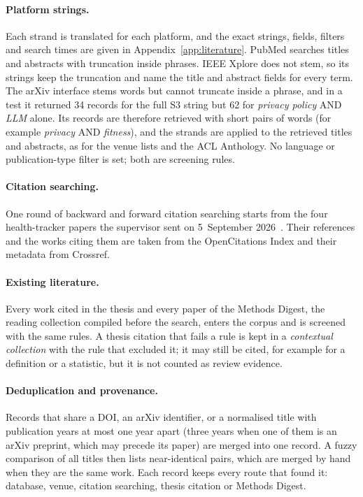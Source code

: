 \paragraph{Platform strings.} Each strand is translated for each platform, and
the exact strings, fields, filters and search times are given in
Appendix~\ref{app:literature}. PubMed searches titles and abstracts with
truncation inside phrases. IEEE Xplore does not stem, so its strings keep the
truncation and name the title and abstract fields for every term. The arXiv
interface stems words but cannot truncate inside a phrase, and in a test it
returned 34 records for the full S3 string but 62 for \emph{privacy policy} AND
\emph{LLM} alone. Its records are therefore retrieved with short pairs of words
(for example \emph{privacy} AND \emph{fitness}), and the strands are applied to
the retrieved titles and abstracts, as for the venue lists and the ACL
Anthology. No language or publication-type filter is set; both are screening
rules.

\paragraph{Citation searching.} One round of backward and forward citation
searching starts from the four health-tracker papers the supervisor sent on
5~September 2026~\parencite{malki2024exploring,hudig2025intimate,cao2024deleted,niksirat2024wearable}.
Their references and the works citing them are taken from the OpenCitations
Index and their metadata from Crossref.

\paragraph{Existing literature.} Every work cited in the thesis and every paper
of the Methods Digest, the reading collection compiled before the search,
enters the corpus and is screened with the same rules. A thesis citation that
fails a rule is kept in a \emph{contextual collection} with the rule that
excluded it; it may still be cited, for example for a definition or a
statistic, but it is not counted as review evidence.

\paragraph{Deduplication and provenance.} Records that share a DOI, an arXiv
identifier, or a normalised title with publication years at most one year
apart (three years when one of them is an arXiv preprint, which may precede its
paper) are merged into one record. A fuzzy comparison of all titles then
lists near-identical pairs, which are merged by hand when they are the same
work. Each record keeps every route that found it: database, venue, citation
searching, thesis citation or Methods Digest.

